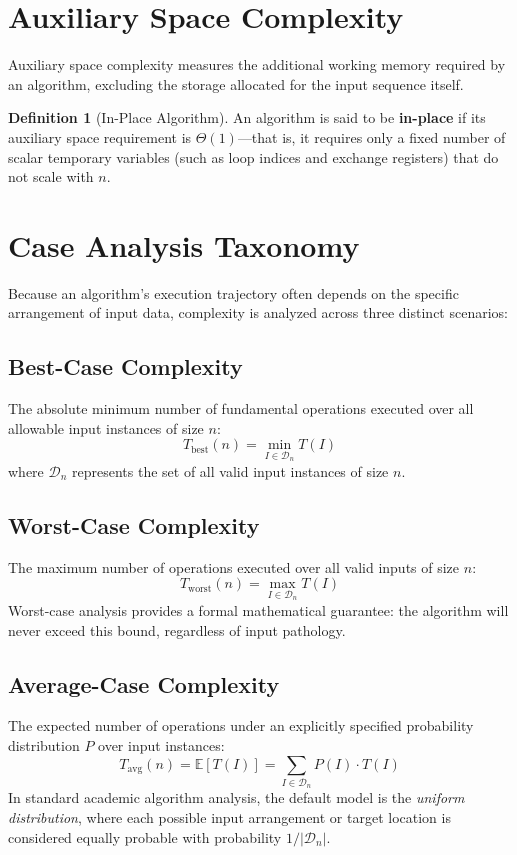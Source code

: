 \documentclass[11pt,a4paper,oneside]{report}
\theoremstyle{definition}
\newtheorem{definition}{Definition}[chapter]
\begin{document}
\section{Auxiliary Space Complexity}
Auxiliary space complexity measures the additional working memory required by an algorithm, excluding the storage allocated for the input sequence itself. 
\begin{definition}[In-Place Algorithm]
An algorithm is said to be \textbf{in-place} if its auxiliary space requirement is $\Theta(1)$—that is, it requires only a fixed number of scalar temporary variables (such as loop indices and exchange registers) that do not scale with $n$.
\end{definition}

\section{Case Analysis Taxonomy}
Because an algorithm's execution trajectory often depends on the specific arrangement of input data, complexity is analyzed across three distinct scenarios:

\subsection{Best-Case Complexity}
The absolute minimum number of fundamental operations executed over all allowable input instances of size $n$:
$$T_{\text{best}}(n) = \min_{I \in \mathcal{D}_n} T(I)$$
where $\mathcal{D}_n$ represents the set of all valid input instances of size $n$.

\subsection{Worst-Case Complexity}
The maximum number of operations executed over all valid inputs of size $n$:
$$T_{\text{worst}}(n) = \max_{I \in \mathcal{D}_n} T(I)$$
Worst-case analysis provides a formal mathematical guarantee: the algorithm will never exceed this bound, regardless of input pathology.

\subsection{Average-Case Complexity}
The expected number of operations under an explicitly specified probability distribution $P$ over input instances:
$$T_{\text{avg}}(n) = \mathbb{E}[T(I)] = \sum_{I \in \mathcal{D}_n} P(I) \cdot T(I)$$
In standard academic algorithm analysis, the default model is the \emph{uniform distribution}, where each possible input arrangement or target location is considered equally probable with probability $1 / |\mathcal{D}_n|$.
\end{document}
